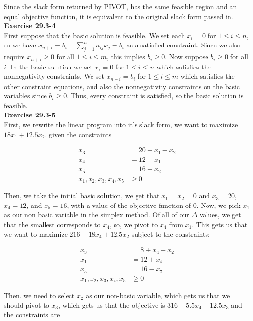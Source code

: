 \documentclass{article}
\begin{document}
Since the slack form returned by PIVOT, has the same feasible region and an equal objective function, it is equivalent to the original slack form passed in.\\

\noindent\textbf{Exercise 29.3-4}\\

First suppose that the basic solution is feasible.  We set each $x_i = 0$ for $1 \leq i \leq n$, so we have $x_{n+i} = b_i - \sum_{j=1}^n a_{ij}x_j = b_i$ as a satisfied constraint.  Since we also require $x_{n+i} \geq 0$ for all $1 \leq i \leq m$, this implies $b_i \geq 0$.  Now suppose $b_i \geq 0$ for all $i$.   In the basic solution we set $x_i = 0$ for $1 \leq i \leq n$ which satisfies the nonnegativity constraints.  We set $x_{n+i} = b_i$ for $1 \leq i \leq m$ which satisfies the other constraint equations, and also the nonnegativity constraints on the basic variables since $b_i \geq 0$.  Thus, every constraint is satisfied, so the basic solution is feasible. \\

\noindent\textbf{Exercise 29.3-5}\\

First, we rewrite the linear program into it's slack form, we want to maximize $18x_1 + 12.5x_2$, given the constraints

\begin{align*}
x_3 & = 20 - x_1 - x_2\\
x_4 & = 12 - x_1 \\
x_5 & = 16 - x_2\\
x_1,x_2,x_3,x_4,x_5 &\ge 0
\end{align*}

Then, we take the initial basic solution, we get that $x_1 = x_2 = 0$ and $x_3 = 20$, $x_4 = 12$, and $x_5 =16$, with a value of the objective function of $0$. Now, we pick $x_1$ as our non basic variable in the simplex method. Of all of our $\Delta$ values, we get that the smallest corresponds to $x_4$, so, we pivot to $x_4$ from $x_1$. This gets us that we want to maximize $216 - 18x_4 +12.5x_2$ subject to the constraints:

\begin{align*}
x_3 & = 8+ x_4 - x_2\\
x_1 & = 12 + x_4 \\
x_5 & = 16 - x_2\\
x_1,x_2,x_3,x_4,x_5 &\ge 0
\end{align*}

Then, we need to select $x_2$ as our non-basic variable, which gets us that we should pivot to $x_3$, which gets us that the objective is $316 -5.5 x_4 - 12.5 x_3$ and the constraints are
\end{document}
